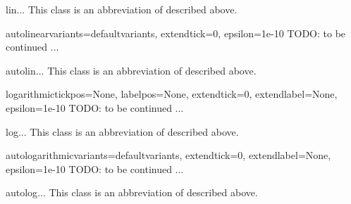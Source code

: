 \begin{classdesc}{lin}{...}
This class is an abbreviation of  described above.
\end{classdesc}

\begin{classdesc}{autolinear}{variants=defaultvariants,
                              extendtick=0,
                              epsilon=1e-10}
  TODO: to be continued ...
\end{classdesc}

\begin{classdesc}{autolin}{...}
This class is an abbreviation of  described above.
\end{classdesc}

\begin{classdesc}{logarithmic}{tickpos=None, labelpos=None,
                               extendtick=0, extendlabel=None,
                               epsilon=1e-10}
  TODO: to be continued ...
\end{classdesc}

\begin{classdesc}{log}{...}
This class is an abbreviation of  described above.
\end{classdesc}

\begin{classdesc}{autologarithmic}{variants=defaultvariants,
                                   extendtick=0, extendlabel=None,
                                   epsilon=1e-10}
  TODO: to be continued ...
\end{classdesc}

\begin{classdesc}{autolog}{...}
This class is an abbreviation of  described above.
\end{classdesc}

